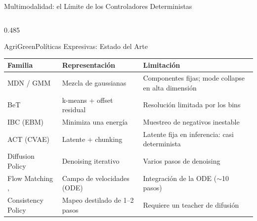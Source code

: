 \documentclass[aspectratio=169,10pt,xcolor={dvipsnames,table}]{beamer}
\newcommand{\CardHeightTall}{46mm}         %
\begin{document}
\begin{frame}{Multimodalidad: el Límite de los Controladores Deterministas}
\begin{columns}[T, onlytextwidth]
\begin{column}{0.485\textwidth}
\begin{Card}[height=\CardHeightTall]{AgriGreen}{Políticas Expresivas: Estado del Arte}
        {\fontsize{4.9}{5.8}\selectfont
        \setlength{\tabcolsep}{1.8pt}
        \renewcommand{\arraystretch}{1.0}
        \begin{tabular}{@{}>{\raggedright\arraybackslash}p{23mm} >{\raggedright\arraybackslash}p{21mm} >{\raggedright\arraybackslash}p{22mm}@{}}
          \toprule
          \textbf{Familia} & \textbf{Representación} & \textbf{Limitación} \\
          \midrule
          MDN / GMM \cite{bishop2006prml} & Mezcla de gaussianas & Componentes fijas; mode collapse en alta dimensión \\
          BeT \cite{shafiullah2022bet} & k-means + offset residual & Resolución limitada por los bins \\
          IBC (EBM) \cite{florence2021ibc} & Minimiza una energía & Muestreo de negativos inestable \\
          ACT (CVAE) \cite{zhao2023act} & Latente + chunking & Latente fija en inferencia: casi determinista \\
          \rowcolor{AgriGreenLight} Diffusion Policy \cite{chi2025diffusion} & Denoising iterativo & Varios pasos de denoising \\
          \rowcolor{AgriGreenLight} Flow Matching \cite{lipman2023flow}, \cite{fang2025flowpolicy} & Campo de velocidades (ODE) & Integración de la ODE ($\sim$10 pasos) \\
          Consistency Policy \cite{prasad2024consistency} & Mapeo destilado de 1--2 pasos & Requiere un teacher de difusión \\
          \bottomrule
        \end{tabular}}
      \end{Card}
    \end{column}
  \end{columns}
\end{frame}
\end{document}
